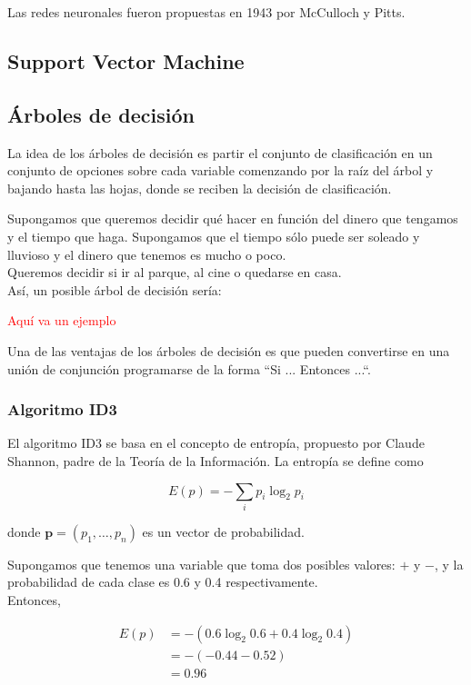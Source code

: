 Las redes neuronales fueron propuestas en 1943 por McCulloch y Pitts.

\subsection{Support Vector Machine}

\subsection{Árboles de decisión}

La idea de los árboles de decisión es partir el conjunto de clasificación en un conjunto de opciones sobre cada variable comenzando por la raíz del árbol y bajando hasta las hojas, donde se reciben la decisión de clasificación. \\

\begin{ejemplo}
Supongamos que queremos decidir qué hacer en función del dinero que tengamos y el tiempo que haga. Supongamos que el tiempo sólo puede ser soleado y lluvioso y el dinero que tenemos es mucho o poco.\\

Queremos decidir si ir al parque, al cine o quedarse en casa.\\

Así, un posible árbol de decisión sería:

\textcolor{red}{Aquí va un ejemplo} 
\end{ejemplo}

Una de las ventajas de los árboles de decisión es que pueden convertirse en una unión de conjunción programarse de la forma ``Si ... Entonces ...``.

\subsubsection{Algoritmo ID3}

El algoritmo ID3 se basa en el concepto de entropía, propuesto por Claude Shannon, padre de la Teoría de la Información. La entropía se define como

\begin{equation}
E(p) = -\sum_{i} p_i \log_2 p_i
\end{equation}

donde $\mathbf{p} = (p_1, \dots, p_n)$ es un vector de probabilidad.

\begin{ejemplo}
Supongamos que tenemos una variable que toma dos posibles valores: $+$ y $-$, y la probabilidad de cada clase es 0.6 y 0.4 respectivamente.\\

Entonces,

\begin{align}
E(p) & = - (0.6 \log_2 0.6 + 0.4 \log_2 0.4) \\
     & = -(-0.44 - 0.52)\\
     & = 0.96
\end{align}
\end{ejemplo}

